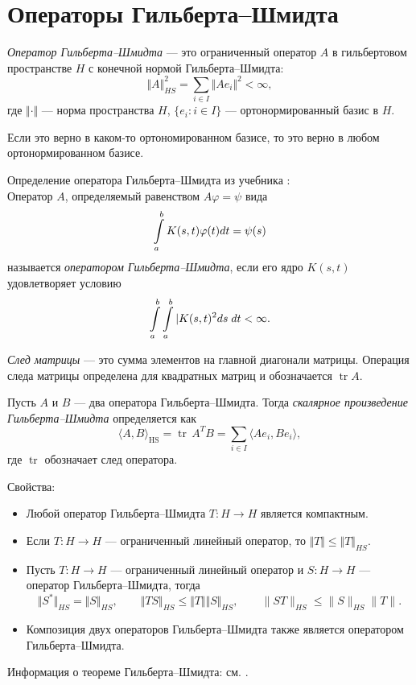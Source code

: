 \section{Операторы Гильберта--Шмидта}
\label{sec:q-40}
\textit{Оператор Гильберта--Шмидта} --- это ограниченный оператор $A$ в гильбертовом пространстве $H$ с конечной нормой Гильберта--Шмидта:
$$\Vert A \Vert_{HS}^2 = \sum_{i \in I} \Vert A e_i \Vert^2 < \infty,$$
где $\Vert \cdot \Vert$ --- норма пространства $H$, $\{e_i : i \in I\}$ --- ортонормированный базис в $H$.

Если это верно в каком-то ортономированном базисе, то это верно в любом ортонормированном базисе.

Определение оператора Гильберта--Шмидта из учебника \cite[с.~460]{kolmogorov}:\\
Оператор $A$, определяемый равенством $A \varphi = \psi$ вида
$$\int\displaylimits_{a}^{b}K(s, t) \varphi(t)dt = \psi(s)$$
называется \textit{оператором Гильберта--Шмидта}, если его ядро $K(s, t)$ удовлетворяет условию
$$\int\displaylimits_a^b\int\displaylimits_a^b|K(s, t)^2 ds\;dt < \infty.$$

\textit{След матрицы} --- это сумма элементов на главной диагонали матрицы. Операция следа матрицы определена для квадратных матриц и обозначается $\operatorname{tr} A$.

Пусть $A$ и $B$ — два оператора Гильберта--Шмидта. Тогда \textit{скалярное произведение Гильберта--Шмидта} определяется как
$$\langle A,B \rangle_\mathrm{HS} = \operatorname{tr}\,A^TB
= \sum_{i \in I} \langle Ae_i, Be_i \rangle,$$
где $\operatorname{tr}$ обозначает след оператора.

Свойства:
\begin{itemize}
	\itemsep0pt
	\item Любой оператор Гильберта--Шмидта $T : H \to H$ является компактным.
	\item Если $T : H \to H$ --- ограниченный линейный оператор, то $\Vert T \Vert \leqslant \Vert T \Vert_{HS}$.
	\item Пусть $T : H \to H$ --- ограниченный линейный оператор и $S : H \to H$ --- оператор Гильберта--Шмидта, тогда
	$$\Vert S^* \Vert_{HS} = \Vert S \Vert_{HS}, \qquad \Vert TS \Vert_{HS} \leqslant \Vert T \Vert \Vert S \Vert_{HS}, \qquad \|ST\|_{HS} \leqslant \|S\|_{HS}\|T\|.$$
	\item Композиция двух операторов Гильберта--Шмидта также является оператором Гильберта--Шмидта.
\end{itemize}

Информация о теореме Гильберта--Шмидта: см. \cite{hilbert-schmidt-theorem}.